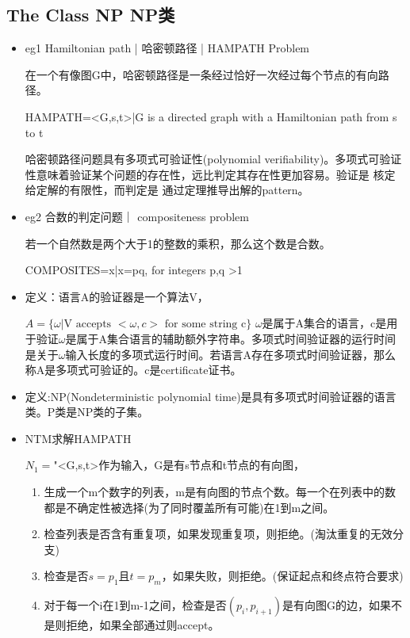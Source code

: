 \documentclass[UTF8]{ctexart}
\begin{document}
\subsection{The Class NP NP类}

\begin{itemize}
    \item eg1 Hamiltonian path | 哈密顿路径 | HAMPATH Problem
    
    在一个有像图G中，哈密顿路径是一条经过恰好一次经过每个节点的有向路径。

    HAMPATH={<G,s,t>|G is a directed graph with a Hamiltonian path from s to t}

    哈密顿路径问题具有多项式可验证性(polynomial verifiability)。多项式可验证性意味着验证某个问题的存在性，远比判定其存在性更加容易。验证是 核定给定解的有限性，而判定是 通过定理推导出解的pattern。

    \item eg2 合数的判定问题｜ compositeness problem
    
    若一个自然数是两个大于1的整数的乘积，那么这个数是合数。

    COMPOSITES={x|x=pq, for integers p,q >1}

    \item 定义：语言A的验证器是一个算法V，
    
    $A=\{\omega|\text{V accepts $<\omega,c>$ for some string c}\}$
    $\omega$是属于A集合的语言，c是用于验证$\omega$是属于A集合语言的辅助额外字符串。多项式时间验证器的运行时间是关于$\omega$输入长度的多项式运行时间。若语言A存在多项式时间验证器，那么称A是多项式可验证的。c是certificate证书。

    \item 定义:NP(Nondeterministic polynomial time)是具有多项式时间验证器的语言类。P类是NP类的子集。
    \item NTM求解HAMPATH
    
    $N_1=$"<G,s,t>作为输入，G是有s节点和t节点的有向图，
    \begin{enumerate}
        \item 生成一个m个数字的列表，m是有向图的节点个数。每一个在列表中的数都是不确定性被选择(为了同时覆盖所有可能)在1到m之间。
        \item 检查列表是否含有重复项，如果发现重复项，则拒绝。(淘汰重复的无效分支)
        \item 检查是否$s=p_1$且$t=p_m$，如果失败，则拒绝。(保证起点和终点符合要求)
        \item 对于每一个i在1到m-1之间，检查是否$(p_i,p_{i+1})$是有向图G的边，如果不是则拒绝，如果全部通过则accept。
    \end{enumerate}


\end{itemize}
\end{document}
